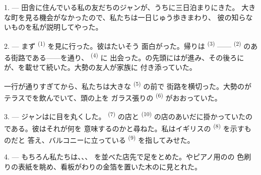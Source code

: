 %
%

\VUsaut{4.0mm}
\VUsaut{3.0mm}

\VUsaut{3.0mm}

1. --- 田舎に住んでいる私の友だちのジャンが、うちに三日泊まりにきた。
大きな町を見る機会がなかったので、私たちは一日じゅう歩きまわり、
彼の知らないものを私が説明してやった。

2. --- まず \textsuperscript{(1)} を見に行った。彼はたいそう
面白がった。帰りは \textsuperscript{(3)} ——
\textsuperscript{(2)} のある街路である——を通り、 \textsuperscript{(4)} に
出会った。の先頭にはが進み、その後ろに
が、を載せて続いた。大勢の友人が家族に
付き添っていた。

一行が通りすぎてから、私たちは大きな \textsuperscript{(5)} の前で
街路を横切った。大勢のがテラスでを飲んでいて、頭の上を
ガラス張りの \textsuperscript{(6)} がおおっていた。

3. --- ジャンはに目を丸くした。 \textsuperscript{(7)} の店と
 \textsuperscript{(10)} の店のあいだに掛かっていたのである。彼はそれが何を
意味するのかと尋ねた。私はイギリスの \textsuperscript{(8)} を示すものだと
答え、バルコニーに立っている \textsuperscript{(9)} を指してみせた。

\VUsaut{3.0mm}

4. --- もちろん私たちは、、、
を並べた店先で足をとめた。やピアノ用のの
色刷りの表紙を眺め、看板がわりの金箔を置いた木のに見とれた。

